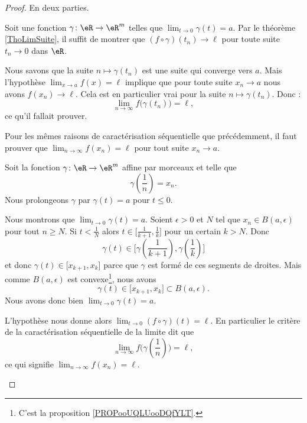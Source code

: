 \begin{proof}
	En deux parties.
	\begin{subproof}
		Soit une fonction \( \gamma\colon \eR\to \eR^m\) telles que \( \lim_{t\to 0} \gamma(t)=a\). Par le théorème \ref{ThoLimSuite}, il suffit de montrer que \( (f\circ\gamma)(t_n)\to\ell\) pour toute suite \( t_n\to 0\) dans \( \eR\).

		Nous savons que la suite \( n\mapsto \gamma(t_n)\) est une suite qui converge vers \( a\). Mais l'hypothèse \( \lim_{x\to a} f(x)=\ell\) implique que pour toute suite \( x_n\to a\) nous avons \( f(x_n)\to \ell\). Cela est en particulier vrai pour la suite \( n\mapsto \gamma(t_n)\). Donc :
		\begin{equation}
			\lim_{n\to \infty} f\big( \gamma(t_n) \big)=\ell,
		\end{equation}
		ce qu'il fallait prouver.
		\spitem[Réciproque]

		Pour les mêmes raisons de caractérisation séquentielle que précédemment, il faut prouver que \( \lim_{n\to \infty} f(x_n)=\ell\) pour tout suite \( x_n\to a\).

		\begin{subproof}
			\spitem[Un chemin]

			Soit la fonction \( \gamma\colon \eR\to \eR^m\) affine par morceaux et telle que
			\begin{equation}
				\gamma\left( \frac{1}{ n } \right)=x_n.
			\end{equation}
			Nous prolongeons \( \gamma\) par \( \gamma(t)=a\) pour \( t\leq 0\).

			\spitem[\( \gamma(t)\to a\)]

			Nous montrons que \( \lim_{t\to 0} \gamma(t)=a\). Soient \( \epsilon>0\) et \( N\) tel que \( x_n\in B(a,\epsilon)\) pour tout \( n\geq N\). Si \( t<\frac{1}{ N }\) alors \( t\in\mathopen[ \frac{1}{ k+1 } , \frac{1}{ k } \mathclose]\) pour un certain \( k>N\). Donc
			\begin{equation}
				\gamma(t)\in\mathopen[ \gamma(\frac{1}{ k+1 }) , \gamma(\frac{1}{ k }) \mathclose]
			\end{equation}
			et donc \( \gamma(t)\in\mathopen[ x_{k+1} , x_k \mathclose]\) parce que \( \gamma\) est formé de ces segments de droites. Mais comme \( B(a,\epsilon)\) est convexe\footnote{C'est la proposition \ref{PROPooUQLUooDQfYLT}.}, nous avons
			\begin{equation}
				\gamma(t)\in\mathopen[ x_{k+1} , x_k \mathclose]\subset B(a,\epsilon).
			\end{equation}
			Nous avons donc bien \( \lim_{t\to 0} \gamma(t)=a\).
			\spitem[Conclusion]

			L'hypothèse nous donne alors \( \lim_{t\to 0} (f\circ \gamma)(t)=\ell\). En particulier le critère de la caractérisation séquentielle de la limite dit que
			\begin{equation}
				\lim_{n\to \infty} f\big( \gamma(\frac{1}{ n }) \big)=\ell,
			\end{equation}
			ce qui signifie \( \lim_{n\to \infty} f(x_n)=\ell\).
		\end{subproof}
	\end{subproof}
\end{proof}

